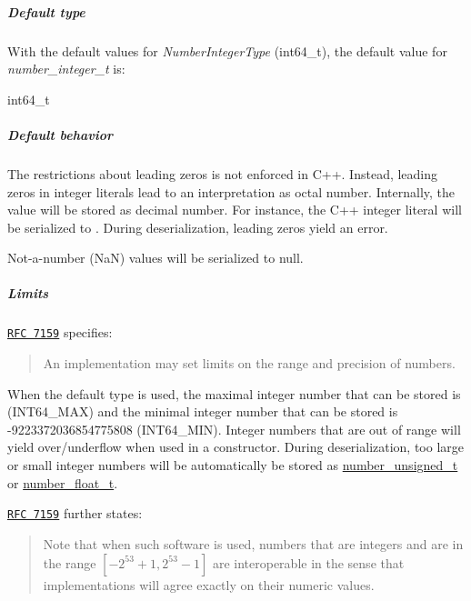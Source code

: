 \subparagraph*{Default type}

With the default values for {\itshape Number\+Integer\+Type} ({\ttfamily int64\+\_\+t}), the default value for {\itshape number\+\_\+integer\+\_\+t} is\+:


\begin{DoxyCode}
int64\_t
\end{DoxyCode}


\subparagraph*{Default behavior}


\begin{DoxyItemize}
\item The restrictions about leading zeros is not enforced in C++. Instead, leading zeros in integer literals lead to an interpretation as octal number. Internally, the value will be stored as decimal number. For instance, the C++ integer literal {} will be serialized to {}. During deserialization, leading zeros yield an error.
\item Not-\/a-\/number (NaN) values will be serialized to {\ttfamily null}.
\end{DoxyItemize}

\subparagraph*{Limits}

\href{http://rfc7159.net/rfc7159}{\tt R\+FC 7159} specifies\+: \begin{quote}
An implementation may set limits on the range and precision of numbers. \end{quote}


When the default type is used, the maximal integer number that can be stored is {} (I\+N\+T64\+\_\+\+M\+AX) and the minimal integer number that can be stored is {\ttfamily -\/9223372036854775808} (I\+N\+T64\+\_\+\+M\+IN). Integer numbers that are out of range will yield over/underflow when used in a constructor. During deserialization, too large or small integer numbers will be automatically be stored as \hyperlink{classnlohmann_1_1basic__json_ab906e29b5d83ac162e823ada2156b989}{number\+\_\+unsigned\+\_\+t} or \hyperlink{classnlohmann_1_1basic__json_a88d6103cb3620410b35200ee8e313d97}{number\+\_\+float\+\_\+t}.

\href{http://rfc7159.net/rfc7159}{\tt R\+FC 7159} further states\+: \begin{quote}
Note that when such software is used, numbers that are integers and are in the range $[-2^{53}+1, 2^{53}-1]$ are interoperable in the sense that implementations will agree exactly on their numeric values. \end{quote}


